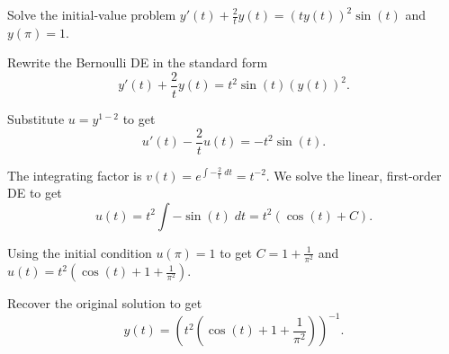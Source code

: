 \documentclass[../main.tex]{subfiles}
\begin{document}
\begin{exercise}
  Solve the initial-value problem \(y'(t) + \frac{2}{t} y(t) = (t y(t))^{2} \sin(t)\) and \(y(\pi) = 1\).

  \begin{solution}
    Rewrite the Bernoulli DE in the standard form
    \[
      y'(t) + \frac{2}{t} y(t) = t^{2} \sin(t) \left( y(t) \right)^{2}.
    \]

    Substitute \(u = y^{1-2}\) to get
    \[
      u'(t) - \frac{2}{t} u(t) = -t^{2}\sin(t).
    \]

    The integrating factor is \(v(t) = e^{\int -\frac{2}{t} \;dt} = t^{-2}\). We solve the linear, first-order DE to get
    \[
      u(t) = t^{2} \int -\sin(t) \;dt = t^{2}(\cos(t) + C).
    \]

    Using the initial condition \(u(\pi) = 1\) to get \(C = 1 + \frac{1}{\pi^{2}}\) and \(u(t) = t^{2}\left( \cos(t) + 1 + \frac{1}{\pi^{2}} \right)\).

    Recover the original solution to get
    \[
      y(t) = \left( t^{2}\left( \cos(t) + 1 + \frac{1}{\pi^{2}} \right) \right)^{-1}.
    \]
  \end{solution}
\end{exercise}
\end{document}
